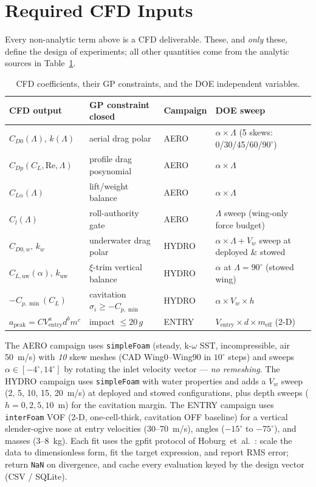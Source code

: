 \documentclass{new-aiaa}
\begin{document}
\section{Required CFD Inputs}\label{sec:cfd}
Every non-analytic term above is a CFD deliverable. These, and \emph{only} these, define the design
of experiments; all other quantities come from the analytic sources in Table~\ref{tab:cfd}.
\begin{table}[h]\centering
\caption{CFD coefficients, their GP constraints, and the DOE independent variables.}\label{tab:cfd}
\begin{tabular}{@{}llll@{}}\toprule
CFD output & GP constraint closed & Campaign & DOE sweep \\\midrule
$C_{D0}(\Lambda),\,k(\Lambda)$ & aerial drag polar & AERO & $\alpha\times\Lambda$ (5 skews: 0/30/45/60/90$^\circ$) \\
$C_{Dp}(C_L,\mathrm{Re},\Lambda)$ & profile drag posynomial & AERO & $\alpha\times\Lambda$ \\
$C_{L\alpha}(\Lambda)$ & lift/weight balance & AERO & $\alpha\times\Lambda$ \\
$C_l(\Lambda)$ & roll-authority gate & AERO & $\Lambda$ sweep (wing-only force budget) \\
\addlinespace
$C_{D0,w},\,k_w$ & underwater drag polar & HYDRO & $\alpha\times\Lambda + V_w$ sweep at deployed \& stowed \\
$C_{L,\text{uw}}(\alpha),\,k_{\text{uw}}$ & $\xi$-trim vertical balance & HYDRO & $\alpha$ at $\Lambda=90^\circ$ (stowed wing) \\
$-C_{p,\min}(C_L)$ & cavitation $\sigma_i\ge -C_{p,\min}$ & HYDRO & $\alpha\times V_w\times h$ \\
\addlinespace
$a_{\text{peak}}=C V_{\text{entry}}^a d^b m^c$ & impact $\le20\,g$ & ENTRY & $V_{\text{entry}}\times d\times m_{\text{eff}}$ (2-D) \\\bottomrule
\end{tabular}
\end{table}
The AERO campaign uses \texttt{simpleFoam} (steady, k-$\omega$ SST, incompressible, air 50~m/s) with
\emph{10} skew meshes (CAD Wing0--Wing90 in $10^\circ$ steps) and sweeps $\alpha\in[-4^\circ,14^\circ]$
by rotating the inlet velocity vector — \emph{no remeshing}. The HYDRO campaign uses \texttt{simpleFoam}
with water properties and adds a $V_w$ sweep (2, 5, 10, 15, 20~m/s) at deployed and stowed configurations,
plus depth sweeps ($h=0,2,5,10$~m) for the cavitation margin. The ENTRY campaign uses
\texttt{interFoam} VOF (2-D, one-cell-thick, cavitation OFF baseline) for a vertical slender-ogive nose
at entry velocities (30--70~m/s), angles ($-15^\circ$ to $-75^\circ$), and masses (3--8~kg). Each
fit uses the gpfit protocol of Hoburg~et~al.~\cite{hoburg2016data}: scale the data to
dimensionless form, fit the target expression, and report RMS error; return \texttt{NaN} on
divergence, and cache every evaluation keyed by the design vector (CSV / SQLite).
\end{document}
